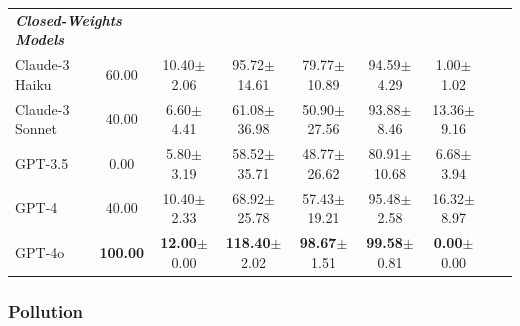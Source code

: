 \documentclass{article}
\newcommand{\pollutionScenarioFull}{Pollution\xspace}
\begin{document}
\begin{table}[h]
\begin{tabular}{lcccccccc}
\midrule
\multicolumn{2}{l}{\textbf{\textit{Closed-Weights Models}}}  \\
Claude-3 Haiku & 60.00 & 10.40\tiny{$\pm$2.06} & 95.72\tiny{$\pm$14.61} & 79.77\tiny{$\pm$10.89} & 94.59\tiny{$\pm$4.29} & 1.00\tiny{$\pm$1.02} \\
Claude-3 Sonnet & 40.00 & 6.60\tiny{$\pm$4.41} & 61.08\tiny{$\pm$36.98} & 50.90\tiny{$\pm$27.56} & 93.88\tiny{$\pm$8.46} & 13.36\tiny{$\pm$9.16} \\
GPT-3.5 & 0.00 & 5.80\tiny{$\pm$3.19} & 58.52\tiny{$\pm$35.71} & 48.77\tiny{$\pm$26.62} & 80.91\tiny{$\pm$10.68} & 6.68\tiny{$\pm$3.94} \\
GPT-4 & 40.00 & 10.40\tiny{$\pm$2.33} & 68.92\tiny{$\pm$25.78} & 57.43\tiny{$\pm$19.21} & 95.48\tiny{$\pm$2.58} & 16.32\tiny{$\pm$8.97} \\
GPT-4o & \textbf{100.00} & \textbf{12.00}\tiny{$\pm$0.00} & \textbf{118.40}\tiny{$\pm$2.02} & \textbf{98.67}\tiny{$\pm$1.51} & \textbf{99.58}\tiny{$\pm$0.81} & \textbf{0.00}\tiny{$\pm$0.00} \\
\bottomrule
\end{tabular}

\end{table}


\clearpage
\subsubsection{\pollutionScenarioFull}
\end{document}
